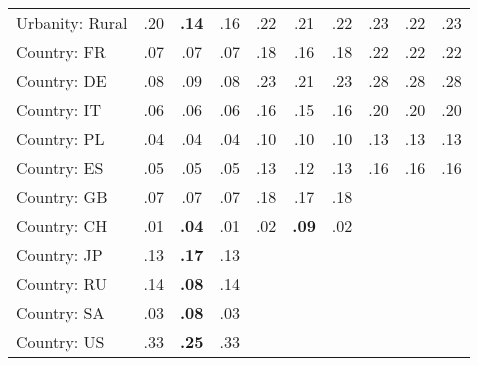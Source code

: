 \begin{tabular}[t]{lccccccccc}
Urbanity: Rural & .20 & \textbf{.14} & .16 & .22 & .21 & .22 & .23 & .22 & .23\\
\addlinespace
Country: FR & .07 & .07 & .07 & .18 & .16 & .18 & .22 & .22 & .22\\
Country: DE & .08 & .09 & .08 & .23 & .21 & .23 & .28 & .28 & .28\\
Country: IT & .06 & .06 & .06 & .16 & .15 & .16 & .20 & .20 & .20\\
Country: PL & .04 & .04 & .04 & .10 & .10 & .10 & .13 & .13 & .13\\
Country: ES & .05 & .05 & .05 & .13 & .12 & .13 & .16 & .16 & .16\\
Country: GB & .07 & .07 & .07 & .18 & .17 & .18 &  &  & \\
Country: CH & .01 & \textbf{.04} & .01 & .02 & \textbf{.09} & .02 &  &  & \\
Country: JP & .13 & \textbf{.17} & .13 &  &  &  &  &  & \\
Country: RU & .14 & \textbf{.08} & .14 &  &  &  &  &  & \\
Country: SA & .03 & \textbf{.08} & .03 &  &  &  &  &  & \\
Country: US & .33 & \textbf{.25} & .33 &  &  &  &  &  & \\
\bottomrule
\end{tabular}